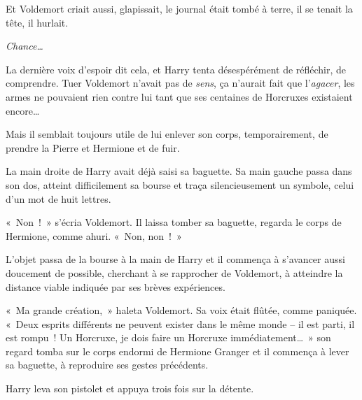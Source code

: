 Et Voldemort criait aussi, glapissait, le journal était tombé à terre, il se tenait la tête, il hurlait.

\emph{Chance…}

La dernière voix d'espoir dit cela, et Harry tenta désespérément de réfléchir, de comprendre. Tuer Voldemort n'avait pas de \emph{sens}, ça n'aurait fait que l'\emph{agacer}, les armes ne pouvaient rien contre lui tant que ses centaines de Horcruxes existaient encore…

Mais il semblait toujours utile de lui enlever son corps, temporairement, de prendre la Pierre et Hermione et de fuir.

La main droite de Harry avait déjà saisi sa baguette. Sa main gauche passa dans son dos, atteint difficilement sa bourse et traça silencieusement un symbole, celui d'un mot de huit lettres.

«~Non~!~» s'écria Voldemort. Il laissa tomber sa baguette, regarda le corps de Hermione, comme ahuri. «~Non, non~!~»

L'objet passa de la bourse à la main de Harry et il commença à s'avancer aussi doucement de possible, cherchant à se rapprocher de Voldemort, à atteindre la distance viable indiquée par ses brèves expériences.

«~Ma grande création,~» haleta Voldemort. Sa voix était flûtée, comme paniquée. «~Deux esprits différents ne peuvent exister dans le même monde -- il est parti, il est rompu~! Un Horcruxe, je dois faire un Horcruxe immédiatement…~» son regard tomba sur le corps endormi de Hermione Granger et il commença à lever sa baguette, à reproduire ses gestes précédents.

Harry leva son pistolet et appuya trois fois sur la détente.
